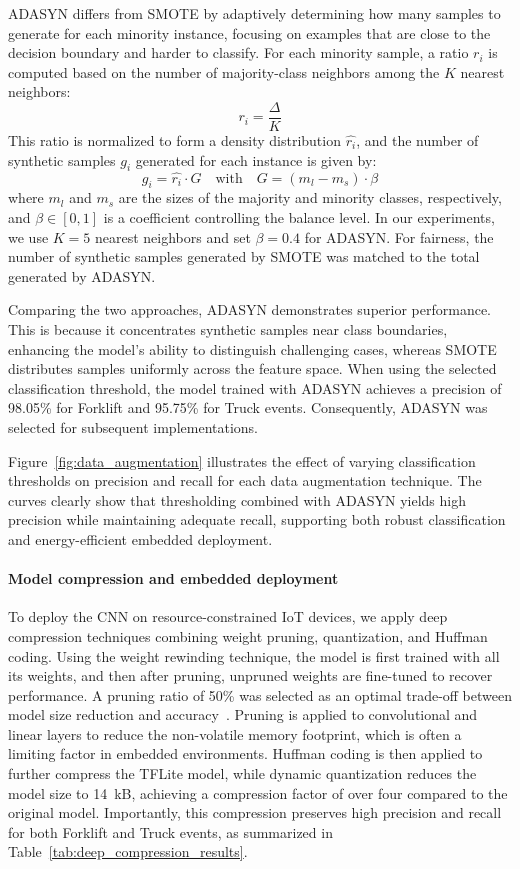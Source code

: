 \documentclass[11pt]{report}
\begin{document}
ADASYN differs from SMOTE by adaptively determining how many samples to generate for each minority instance, focusing on examples that are close to the decision boundary and harder to classify. For each minority sample, a ratio \(r_i\) is computed based on the number of majority-class neighbors among the \(K\) nearest neighbors:
\[
  r_i = \frac{\Delta}{K}
\]
This ratio is normalized to form a density distribution \(\hat{r_i}\), and the number of synthetic samples \(g_i\) generated for each instance is given by:
\[
  g_i = \hat{r_i} \cdot G \quad \text{with} \quad G = (m_l - m_s) \cdot \beta
\]
where \(m_l\) and \(m_s\) are the sizes of the majority and minority classes, respectively, and \(\beta \in [0,1]\) is a coefficient controlling the balance level. In our experiments, we use \(K=5\) nearest neighbors and set \(\beta=0.4\) for ADASYN. For fairness, the number of synthetic samples generated by SMOTE was matched to the total generated by ADASYN.

Comparing the two approaches, ADASYN demonstrates superior performance. This is because it concentrates synthetic samples near class boundaries, enhancing the model's ability to distinguish challenging cases, whereas SMOTE distributes samples uniformly across the feature space. When using the selected classification threshold, the model trained with ADASYN achieves a precision of 98.05\% for Forklift and 95.75\% for Truck events. Consequently, ADASYN was selected for subsequent implementations.

Figure~\ref{fig:data_augmentation} illustrates the effect of varying classification thresholds on precision and recall for each data augmentation technique. The curves clearly show that thresholding combined with ADASYN yields high precision while maintaining adequate recall, supporting both robust classification and energy-efficient embedded deployment.

\paragraph{Model compression and embedded deployment}
To deploy the CNN on resource-constrained IoT devices, we apply deep compression techniques combining weight pruning, quantization, and Huffman coding. Using the weight rewinding technique, the model is first trained with all its weights, and then after pruning, unpruned weights are fine-tuned to recover performance. A pruning ratio of 50\% was selected as an optimal trade-off between model size reduction and accuracy~\cite{younes:hal-03850858}. Pruning is applied to convolutional and linear layers to reduce the non-volatile memory footprint, which is often a limiting factor in embedded environments. Huffman coding is then applied to further compress the TFLite model, while dynamic quantization reduces the model size to 14~kB, achieving a compression factor of over four compared to the original model. Importantly, this compression preserves high precision and recall for both Forklift and Truck events, as summarized in Table~\ref{tab:deep_compression_results}.
\end{document}
